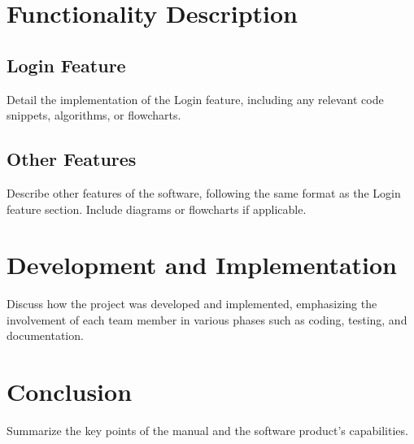 \documentclass[12pt]{article}
\begin{document}
\section{Functionality Description}
\subsection{Login Feature}
Detail the implementation of the Login feature, including any relevant code snippets, algorithms, or flowcharts.

\subsection{Other Features}
Describe other features of the software, following the same format as the Login feature section. Include diagrams or flowcharts if applicable.

\section{Development and Implementation}
Discuss how the project was developed and implemented, emphasizing the involvement of each team member in various phases such as coding, testing, and documentation.

\section{Conclusion}
Summarize the key points of the manual and the software product's capabilities.
\end{document}
